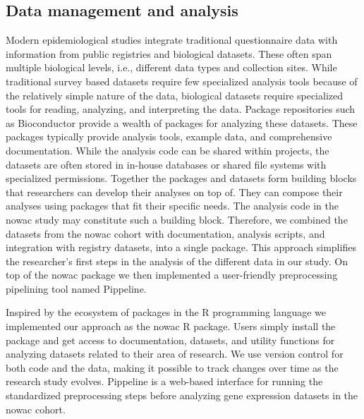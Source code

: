 \subsection{Data management and analysis} 
Modern epidemiological studies integrate traditional questionnaire data with
information from public registries and biological datasets. These often span
multiple biological levels, i.e., different data types and collection sites.
While traditional survey based datasets require few specialized analysis tools
because of the relatively simple nature of the data, biological datasets require
specialized tools for reading, analyzing, and interpreting the data. Package
repositories such as Bioconductor\cite{bioconductor} provide a wealth of
packages for analyzing these datasets. These packages typically provide analysis
tools, example data, and comprehensive documentation. While the analysis code
can be shared within projects, the datasets are often stored in in-house
databases or shared file systems with specialized permissions. Together the
packages and datasets form building blocks that researchers can develop their
analyses on top of. They can compose their analyses using packages that fit
their specific needs. The analysis code in the \gls{nowac} study may constitute
such a building block. Therefore, we combined the datasets from the \gls{nowac}
cohort with documentation, analysis scripts, and integration with registry
datasets, into a single package.  This approach simplifies the researcher's
first steps in the analysis of the different data in our study. On top of the
\gls{nowac} package we then implemented a user-friendly preprocessing pipelining
tool named Pippeline. 

Inspired by the ecosystem of packages in the R programming language we
implemented our approach as the \gls{nowac} R package. Users simply install the
package and get access to documentation, datasets, and utility functions for
analyzing datasets related to their area of research. We use version
control for both code and the data, making it possible to track changes over
time as the research study evolves. Pippeline is a web-based interface for
running the standardized preprocessing steps before analyzing gene expression
datasets in the \gls{nowac} cohort. 

